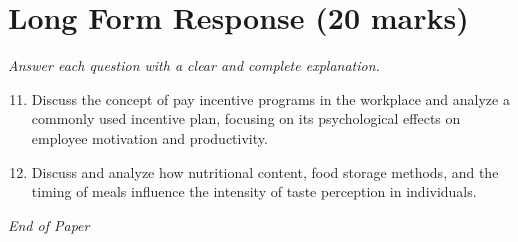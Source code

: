 \documentclass[12pt]{article}
\begin{document}
\section*{Long Form Response (20 marks)}
\textit{Answer each question with a clear and complete explanation.}
\begin{enumerate}[label=\arabic*.]
\setcounter{enumi}{10}
\item Discuss the concept of pay incentive programs in the workplace and analyze a commonly used incentive plan, focusing on its psychological effects on employee motivation and productivity.
\item Discuss and analyze how nutritional content, food storage methods, and the timing of meals influence the intensity of taste perception in individuals.
\end{enumerate}

\vfill
\noindent\textit{End of Paper}
\end{document}
